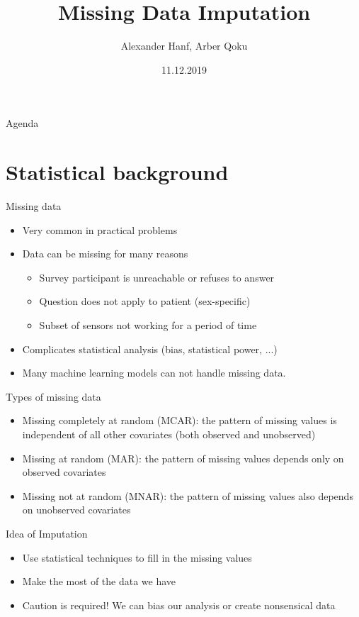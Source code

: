 \documentclass[aspectratio=43]{beamer}
\title{Missing Data Imputation}
\date{11.12.2019}
\author{Alexander Hanf, Arber Qoku}
\begin{document}
%
\maketitle

\begin{frame}{Agenda}
\tableofcontents
\end{frame}

\section{Statistical background}

\begin{frame}{Missing data}
\begin{itemize}
\item Very common in practical problems
\item Data can be missing for many reasons
\begin{itemize}
\item Survey participant is unreachable or refuses to answer
\item Question does not apply to patient (sex-specific)
\item Subset of sensors not working for a period of time
\end{itemize}
\item Complicates statistical analysis (bias, statistical power, ...)
\item Many machine learning models can not handle missing data.
\end{itemize}
\end{frame}

\begin{frame}{Types of missing data}
\begin{itemize}
\item Missing completely at random (MCAR): the pattern of missing values is independent of all other covariates (both observed and unobserved)
\item Missing at random (MAR): the pattern of missing values depends only on observed covariates
\item Missing not at random (MNAR): the pattern of missing values also depends on unobserved covariates
\end{itemize}
\end{frame}

\begin{frame}{Idea of Imputation}
\begin{itemize}
\item Use statistical techniques to fill in the missing values
\item Make the most of the data we have
\item Caution is required! We can bias our analysis or create nonsensical data
\end{itemize}
\end{frame}
\end{document}
